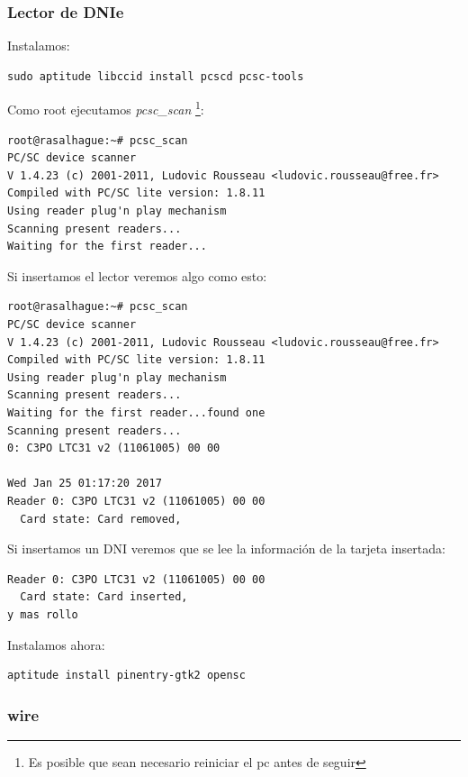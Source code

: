 \documentclass[12pt,spanish,]{scrartcl}
\begin{document}
\subsubsection{Lector de DNIe}\label{lector-de-dnie}

Instalamos:

\begin{verbatim}
sudo aptitude libccid install pcscd pcsc-tools
\end{verbatim}

Como root ejecutamos \emph{pcsc\_scan} \footnote{Es posible que sean
  necesario reiniciar el pc antes de seguir}:

\begin{verbatim}
root@rasalhague:~# pcsc_scan 
PC/SC device scanner
V 1.4.23 (c) 2001-2011, Ludovic Rousseau <ludovic.rousseau@free.fr>
Compiled with PC/SC lite version: 1.8.11
Using reader plug'n play mechanism
Scanning present readers...
Waiting for the first reader...
\end{verbatim}

Si insertamos el lector veremos algo como esto:

\begin{verbatim}
root@rasalhague:~# pcsc_scan 
PC/SC device scanner
V 1.4.23 (c) 2001-2011, Ludovic Rousseau <ludovic.rousseau@free.fr>
Compiled with PC/SC lite version: 1.8.11
Using reader plug'n play mechanism
Scanning present readers...
Waiting for the first reader...found one
Scanning present readers...
0: C3PO LTC31 v2 (11061005) 00 00

Wed Jan 25 01:17:20 2017
Reader 0: C3PO LTC31 v2 (11061005) 00 00
  Card state: Card removed, 
\end{verbatim}

Si insertamos un DNI veremos que se lee la información de la tarjeta
insertada:

\begin{verbatim}
Reader 0: C3PO LTC31 v2 (11061005) 00 00
  Card state: Card inserted, 
y mas rollo
\end{verbatim}

Instalamos ahora:

\begin{verbatim}
aptitude install pinentry-gtk2 opensc
\end{verbatim}

\subsubsection{wire}\label{wire}
\end{document}
